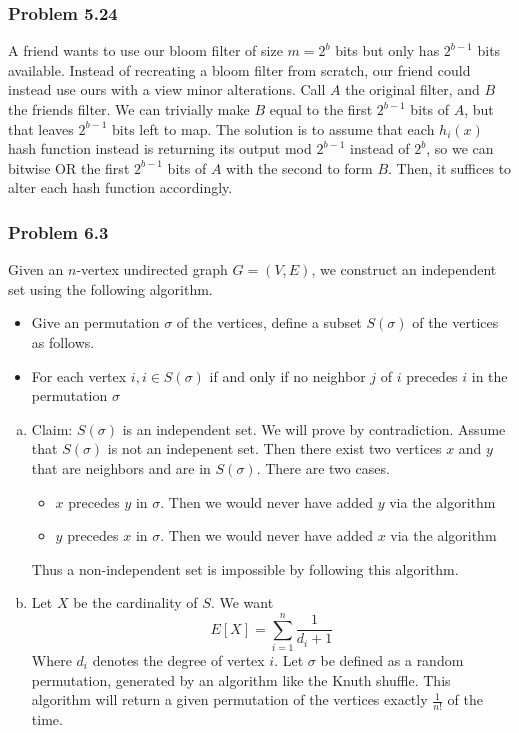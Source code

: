\documentclass[12pt,letterpaper]{article}
\newenvironment{answer}[1]{
  \subsubsection*{Problem #1}
}{\newpage}
\begin{document}
\begin{answer}{5.24}
A friend wants to use our bloom filter of size $m = 2^b$ bits but only has $2^{b-1}$ bits available. Instead of recreating a bloom filter from scratch, our friend could instead use ours with a view minor alterations. Call $A$ the original filter, and $B$ the friends filter. We can trivially make $B$ equal to the first $2^{b-1}$ bits of $A$, but that leaves $2^{b-1}$ bits left to map. The solution is to assume that each $h_i(x)$ hash function instead is returning its output mod $2^{b-1}$ instead of $2^b$, so we can bitwise OR the first $2^{b-1}$ bits of $A$ with the second to form $B$. Then, it suffices to alter each hash function accordingly.
\end{answer}

\begin{answer}{6.3}
Given an $n$-vertex undirected graph $G = (V, E)$, we construct an independent set using the following algorithm.
\begin{itemize}
	\item Give an permutation $\sigma$ of the vertices, define a subset $S(\sigma)$ of the vertices as follows.
	\item For each vertex $i, i\in S(\sigma)$ if and only if no neighbor $j$ of $i$ precedes $i$ in the permutation $\sigma$
\end{itemize}
\begin{enumerate}[(a)]
	\item Claim: $S(\sigma)$ is an independent set. We will prove by contradiction. Assume that $S(\sigma)$ is not an indepenent set. Then there exist two vertices $x$ and $y$ that are neighbors and are in $S(\sigma)$. There are two cases.
		\begin{itemize}
			\item $x$ precedes $y$ in $\sigma$. Then we would never have added $y$ via the algorithm
			\item $y$ precedes $x$ in $\sigma$. Then we would never have added $x$ via the algorithm
		\end{itemize}
		Thus a non-independent set is impossible by following this algorithm.
	\item Let $X$ be the cardinality of $S$. We want
		$$ E[X] = \sum_{i=1}^n \frac{1}{d_i + 1}$$
		Where $d_i$ denotes the degree of vertex $i$. Let $\sigma$ be defined as a random permutation, generated by an algorithm like the Knuth shuffle. This algorithm will return a given permutation of the vertices exactly $\frac{1}{n!}$ of the time.\\


\end{enumerate}
\end{answer}
\end{document}
